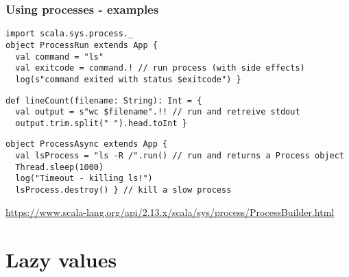 \documentclass[aspectratio=169]{beamer}
\begin{document}
\begin{frame}[fragile]\frametitle{Using processes - examples}
    
\begin{lstlisting}[emph={execute,sleep,log,destroy,!}]
import scala.sys.process._
object ProcessRun extends App {
  val command = "ls"
  val exitcode = command.! // run process (with side effects)
  log(s"command exited with status $exitcode") }
\end{lstlisting}

\begin{lstlisting}[emph={execute,sleep,log,destroy,!}]
def lineCount(filename: String): Int = {
  val output = s"wc $filename".!! // run and retreive stdout
  output.trim.split(" ").head.toInt }
\end{lstlisting}

\begin{lstlisting}[emph={execute,sleep,log,destroy}]
object ProcessAsync extends App {
  val lsProcess = "ls -R /".run() // run and returns a Process object
  Thread.sleep(1000)
  log("Timeout - killing ls!")
  lsProcess.destroy() } // kill a slow process
\end{lstlisting}

{\small\url{https://www.scala-lang.org/api/2.13.x/scala/sys/process/ProcessBuilder.html}}

\end{frame}


\section{Lazy values} %
\end{document}
